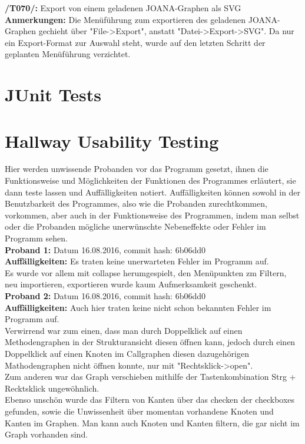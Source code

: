 \textbf{/T070/: }Export von einem geladenen JOANA-Graphen als SVG\\
\textbf{Anmerkungen: }Die Menüführung zum exportieren des geladenen JOANA-Graphen gechieht über "File->Export", anstatt "Datei->Export->SVG". Da nur ein Export-Format zur Auswahl steht, wurde auf den letzten Schritt der geplanten Menüführung verzichtet.\\


\section{JUnit Tests}


\section{Hallway Usability Testing}
Hier werden unwissende Probanden vor das Programm gesetzt, ihnen die Funktionsweise und Möglichkeiten der Funktionen des Programmes erläutert, sie dann teste lassen und Auffälligkeiten notiert. Auffälligkeiten können sowohl in der Benutzbarkeit des Programmes, also wie die Probanden zurechtkommen, vorkommen, aber auch in der Funktionsweise des Programmen, indem man selbst oder die Probanden mögliche unerwünschte Nebeneffekte oder Fehler im Programm sehen.\\

\textbf{Proband 1: } Datum 16.08.2016, commit hash: 6b06dd0\\
\textbf{Auffälligkeiten: } Es traten keine unerwarteten Fehler im Programm auf.\\
Es wurde vor allem mit collapse herumgespielt, den Menüpunkten zm Filtern, neu importieren, exportieren wurde kaum Aufmerksamkeit geschenkt.\\

\textbf{Proband 2:} Datum 16.08.2016, commit hash: 6b06dd0\\
\textbf{Auffälligkeiten: } Auch hier traten keine nicht schon bekannten Fehler im Programm auf.\\
Verwirrend war zum einen, dass man durch Doppelklick auf einen Methodengraphen in der Strukturansicht diesen öffnen kann, jedoch durch einen Doppelklick auf einen Knoten im Callgraphen diesen dazugehörigen Mathodengraphen nicht öffnen konnte, nur mit "Rechtsklick->open".\\
Zum anderen war das Graph verschieben mithilfe der Tastenkombination Strg + Recktsklick ungewöhnlich.\\
Ebenso unschön wurde das Filtern von Kanten über das checken der checkboxes gefunden, sowie die Unwissenheit über momentan vorhandene Knoten und Kanten im Graphen. Man kann auch Knoten und Kanten filtern, die gar nicht im Graph vorhanden sind.\\




